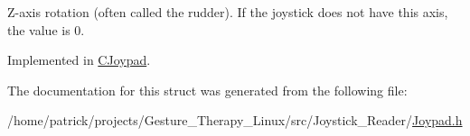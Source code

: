 Z-\/axis rotation (often called the rudder). If the joystick does not have this axis, the value is 0. 

Implemented in \hyperlink{class_c_joypad_a4cd374af62d1380af4f92156503330a7}{C\+Joypad}.



The documentation for this struct was generated from the following file\+:\begin{DoxyCompactItemize}
\item 
/home/patrick/projects/\+Gesture\+\_\+\+Therapy\+\_\+\+Linux/src/\+Joystick\+\_\+\+Reader/\hyperlink{_joypad_8h}{Joypad.\+h}\end{DoxyCompactItemize}
